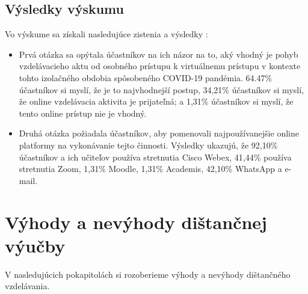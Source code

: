 \documentclass[10pt,oneside,slovak,a4paper]{article}
\begin{document}
\subsection{Výsledky výskumu}
Vo výskume sa získali nasledujúce zistenia a výsledky\cite{covid19} :
\begin{itemize}
	\item Prvá otázka sa opýtala účastníkov na ich názor na to, aký vhodný je pohyb vzdelávacieho aktu od osobného prístupu k virtuálnemu prístupu v kontexte tohto izolačného obdobia spôsobeného COVID-19 pandémia.
	 64.47\% účastníkov si myslí, že je to najvhodnejší postup, 34,21\% účastníkov si myslí, že online vzdelávacia aktivita je prijateľná; a 1,31\% účastníkov si myslí, že tento online prístup nie je vhodný.
	\item Druhá otázka požiadala účastníkov, aby pomenovali najpoužívanejšie online platformy na vykonávanie tejto činnosti. Výsledky ukazujú, že 92,10\% účastníkov a ich učiteľov používa stretnutia Cisco Webex, 41,44\% používa stretnutia Zoom, 1,31\% Moodle, 1,31\% Academis, 42,10\% WhatsApp a e-mail.
\end{itemize}



\section{Výhody a nevýhody dištančnej výučby}
V nasledujúcich pokapitolách si rozoberieme výhody a nevýhody dištančného vzdelávania\cite{Sokolova2018}. 
\end{document}

